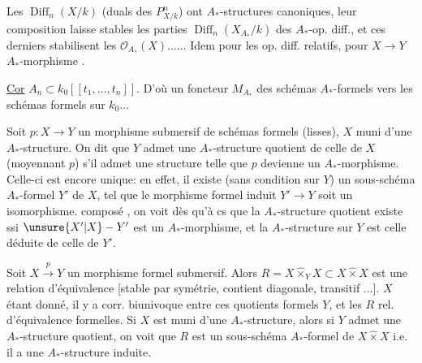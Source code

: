  Les $\operatorname{Diff}_n(X/k)$ (duals des $P^n_{X/k}$) ont  $A_*$-structures canoniques, leur composition  laisse stables les parties $\operatorname{Diff}_n(X_{A_*}/k)$ des $A_*$-op. diff., et ces derniers stabilisent les  $\mathcal O_{A_*}(X)\ldots\ldots$ Idem pour les op. diff. relatifs, pour $X\to Y$ $A_*$-morphisme  .

\uline{Cor} $A_n\subset k_0[[t_1,\ldots,t_n]]$.  D'où un foncteur $M_{A_*}$ des schémas $A_*$-formels vers les schémas formels sur $k_0\ldots$

Soit $p:X\to Y$ un morphisme submersif de schémas formels (lisses),  $X$ muni d'une $A_*$-structure. On dit que $Y$ admet une $A_*$-structure quotient de celle de $X$ (moyennant $p$) s'il admet une  structure telle que $p$ devienne un $A_*$-morphisme. Celle-ci est encore unique: en effet, il existe (sans condition sur $Y$) un  sous-schéma $A_*$-formel $Y'$ de $X$, tel que le morphisme formel induit $Y'\to Y$ soit un isomorphisme.   composé
, on voit dès qu'à cs que la $A_*$-structure quotient existe ssi $\unsure{X'|X}\mathbin{-}Y'$ est un $A_*$-morphisme, et la $A_*$-structure sur $Y$ est celle déduite de celle de $Y'$.

 Soit $X\xrightarrow{p}Y$ un morphisme formel submersif. Alors $R=X\mathbin{\hat\times}_Y X\subset X\mathbin{\hat\times}X$ est une  relation d'équivalence [stable par symétrie, contient diagonale, transitif $\ldots$].   $X$ étant donné, il y a corr. biunivoque entre ces quotients formels $Y$, et les $R$ rel. d'équivalence formelles. Si $X$ est muni d'une $A_*$-structure, alors si $Y$ admet une $A_*$-structure quotient, on voit que $R$ est un sous-schéma $A_*$-formel de $X\mathbin{\hat\times}X$ i.e. il a une $A_*$-structure induite.

